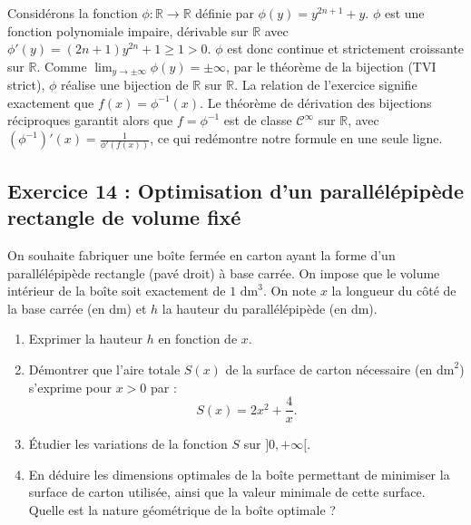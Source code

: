 \documentclass[11pt,a4paper]{article}
\newcommand{\R}{\mathbb{R}}
\begin{document}
\begin{remarquabox}
Considérons la fonction $\phi : \R \to \R$ définie par $\phi(y) = y^{2n+1} + y$.
$\phi$ est une fonction polynomiale impaire, dérivable sur $\R$ avec $\phi'(y) = (2n+1)y^{2n} + 1 \ge 1 > 0$.
$\phi$ est donc continue et strictement croissante sur $\R$. Comme $\lim_{y \to \pm\infty} \phi(y) = \pm\infty$, par le théorème de la bijection (TVI strict), $\phi$ réalise une bijection de $\R$ sur $\R$.
La relation de l'exercice signifie exactement que $f(x) = \phi^{-1}(x)$.
Le théorème de dérivation des bijections réciproques garantit alors que $f = \phi^{-1}$ est de classe $\mathcal{C}^\infty$ sur $\R$, avec $(\phi^{-1})'(x) = \frac{1}{\phi'(f(x))}$, ce qui redémontre notre formule en une seule ligne.
\end{remarquabox}

\subsection*{Exercice 14 : Optimisation d'un parallélépipède rectangle de volume fixé}

On souhaite fabriquer une boîte fermée en carton ayant la forme d'un parallélépipède rectangle (pavé droit) à base carrée.
On impose que le volume intérieur de la boîte soit exactement de $1\text{ dm}^3$.
On note $x$ la longueur du côté de la base carrée (en dm) et $h$ la hauteur du parallélépipède (en dm).
\begin{enumerate}[label=\textbf{\arabic*.}]
    \item Exprimer la hauteur $h$ en fonction de $x$.
    \item Démontrer que l'aire totale $S(x)$ de la surface de carton nécessaire (en $\text{dm}^2$) s'exprime pour $x > 0$ par :
    \[
    S(x) = 2x^2 + \frac{4}{x}.
    \]
    \item Étudier les variations de la fonction $S$ sur $]0, +\infty[$.
    \item En déduire les dimensions optimales de la boîte permettant de minimiser la surface de carton utilisée, ainsi que la valeur minimale de cette surface. Quelle est la nature géométrique de la boîte optimale ?
\end{enumerate}
\end{document}
